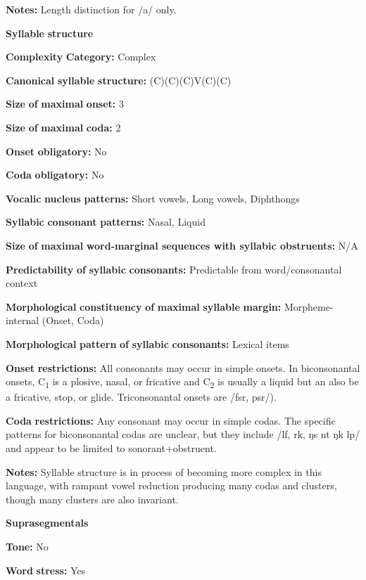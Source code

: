 \begin{styleBody}
\textbf{Notes:} Length distinction for /a/ only.

\textbf{Syllable} \textbf{structure}

\textbf{Complexity} \textbf{Category:} Complex

\textbf{Canonical} \textbf{syllable} \textbf{structure:} (C)(C)(C)V(C)(C) \citep[41-8]{Lacrampe2014}

\textbf{Size} \textbf{of} \textbf{maximal} \textbf{onset:} 3

\textbf{Size} \textbf{of} \textbf{maximal} \textbf{coda:} 2

\textbf{Onset} \textbf{obligatory:} No

\textbf{Coda} \textbf{obligatory:} No

\textbf{Vocalic} \textbf{nucleus} \textbf{patterns:} Short vowels, Long vowels, Diphthongs

\textbf{Syllabic} \textbf{consonant} \textbf{patterns:} Nasal, Liquid

\textbf{Size} \textbf{of} \textbf{maximal} \textbf{word{}-marginal sequences with syllabic obstruents:} N/A

\textbf{Predictability} \textbf{of} \textbf{syllabic} \textbf{consonants:} Predictable from word/consonantal context

\textbf{Morphological} \textbf{constituency} \textbf{of} \textbf{maximal} \textbf{syllable} \textbf{margin:} Morpheme-internal (Onset, Coda)

\textbf{Morphological} \textbf{pattern} \textbf{of} \textbf{syllabic} \textbf{consonants:} Lexical items

\textbf{Onset} \textbf{restrictions:} All consonants may occur in simple onsets. In biconsonantal onsets, C\textsubscript{1} is a plosive, nasal, or fricative and C\textsubscript{2} is usually a liquid but an also be a fricative, stop, or glide. Triconsonantal onsets are /fsr, psr/).

\textbf{Coda} \textbf{restrictions:} Any consonant may occur in simple codas. The specific patterns for biconsonantal codas are unclear, but they include /lf, rk, ŋs nt ŋk lp/ and appear to be limited to sonorant+obstruent.

\textbf{Notes:} Syllable structure is in process of becoming more complex in this language, with rampant vowel reduction producing many codas and clusters, though many clusters are also invariant.

\textbf{Suprasegmentals}

\textbf{Tone:} No

\textbf{Word} \textbf{stress:} Yes


\end{styleBody}
